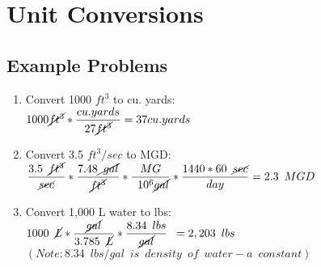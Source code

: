 \documentclass{article}
\begin{document}


\section{Unit Conversions}
\subsection{Example Problems}   
\begin{enumerate}
\item Convert 1000 $ft^3$ to cu. yards:\\
$1000 \cancel{ft^3}*\dfrac{cu.yards}{27\cancel{ft^3}} = 37 cu.yards$\\

\item Convert 3.5 $ft^3/sec$ to MGD:\\
$\dfrac{3.5 \enspace \cancel{ft^3}}{\cancel{sec}} * \dfrac{7.48\cancel {\enspace gal}}{\cancel{ft^3}} * \dfrac{MG}{\enspace 10^6 \cancel{gal}}* \dfrac{1440*60 \enspace \cancel{sec}}{day}=  2.3 \enspace MGD$\\

\item Convert 1,000 L water to lbs:\\
$1000 \enspace \cancel{L}*\dfrac {\cancel{gal}}{3.785 \enspace \cancel{L}}*\dfrac{8.34 \enspace lbs}{\cancel{gal}}\enspace  = 2,203 \enspace lbs$\\
$(Note:8.34 \enspace lbs/gal \enspace is \enspace density \enspace of \enspace water - a \enspace constant)$\\ 
\end{enumerate}
\end{document}
